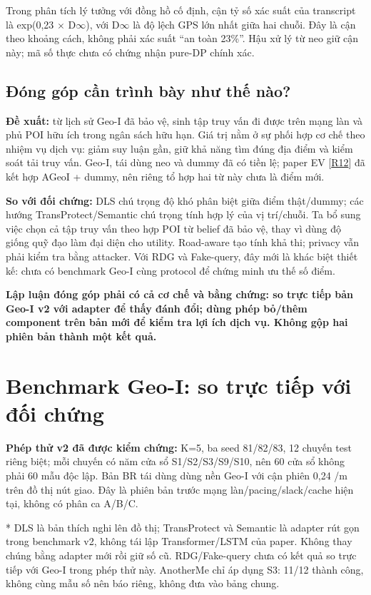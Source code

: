 \documentclass[10pt,a4paper]{article}
\newcommand{\key}[1]{\par\smallskip\noindent\colorbox{pale}{\parbox{\dimexpr\linewidth-2\fboxsep}{\textbf{#1}}}\par\smallskip}
\begin{document}
Trong phân tích lý tưởng với đồng hồ cố định, cận tỷ số xác suất của transcript là exp(0,23 $\times$ D$\infty$), với D$\infty$ là độ lệch GPS lớn nhất giữa hai chuỗi. Đây là cận theo khoảng cách, không phải xác suất “an toàn 23\%”. Hậu xử lý từ neo giữ cận này; mã số thực chưa có chứng nhận pure-DP chính xác.

\subsection{Đóng góp cần trình bày như thế nào?}\label{sub:2.2}
\textbf{Đề xuất:} từ lịch sử Geo-I đã bảo vệ, sinh tập truy vấn đi được trên mạng làn và phủ POI hữu ích trong ngân sách hữu hạn. Giá trị nằm ở sự phối hợp cơ chế theo nhiệm vụ dịch vụ: giảm suy luận gần, giữ khả năng tìm đúng địa điểm và kiểm soát tải truy vấn. Geo-I, tái dùng neo và dummy đã có tiền lệ; paper EV [\hyperlink{ref-R12}{R12}] đã kết hợp AGeoI + dummy, nên riêng tổ hợp hai từ này chưa là điểm mới.

\textbf{So với đối chứng:} DLS chú trọng độ khó phân biệt giữa điểm thật/dummy; các hướng TransProtect/Semantic chú trọng tính hợp lý của vị trí/chuỗi. Ta bổ sung việc chọn cả tập truy vấn theo hợp POI từ belief đã bảo vệ, thay vì dùng độ giống quỹ đạo làm đại diện cho utility. Road-aware tạo tính khả thi; privacy vẫn phải kiểm tra bằng attacker. Với RDG và Fake-query, đây mới là khác biệt thiết kế: chưa có benchmark Geo-I cùng protocol để chứng minh ưu thế số điểm.

\key{Lập luận đóng góp phải có cả cơ chế và bằng chứng: so trực tiếp bản Geo-I v2 với adapter để thấy đánh đổi; dùng phép bỏ/thêm component trên bản mới để kiểm tra lợi ích dịch vụ. Không gộp hai phiên bản thành một kết quả.}


\clearpage
\section{Benchmark Geo-I: so trực tiếp với đối chứng}\label{sec:3}
\textbf{Phép thử v2 đã được kiểm chứng:} K=5, ba seed 81/82/83, 12 chuyến test riêng biệt; mỗi chuyến có năm cửa sổ S1/S2/S3/S9/S10, nên 60 cửa sổ không phải 60 mẫu độc lập. Bản BR tái dùng dùng nền Geo-I với cận phiên 0,24 /m trên đồ thị nút giao. Đây là phiên bản trước mạng làn/pacing/slack/cache hiện tại, không có phân ca A/B/C.

* DLS là bản thích nghi lên đồ thị; TransProtect và Semantic là adapter rút gọn trong benchmark v2, không tái lập Transformer/LSTM của paper. Không thay chúng bằng adapter mới rồi giữ số cũ. RDG/Fake-query chưa có kết quả so trực tiếp với Geo-I trong phép thử này. AnotherMe chỉ áp dụng S3: 11/12 thành công, không cùng mẫu số nên báo riêng, không đưa vào bảng chung.
\end{document}
